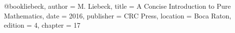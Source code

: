 @book{liebeck,
    author = {M. Liebeck},
    title = {A Concise Introduction to Pure Mathematics},
    date = {2016},
    publisher = {CRC Press},
    location = {Boca Raton},
    edition = {4},
    chapter = {17}
}
